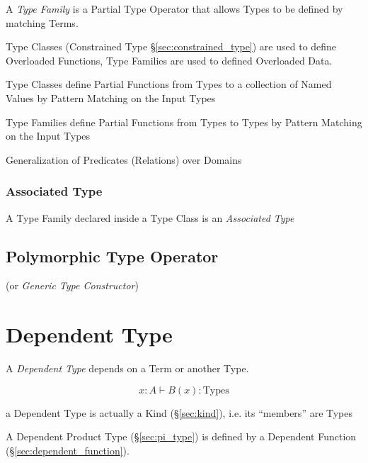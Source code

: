 A \emph{Type Family} is a Partial Type Operator that allows Types to
be defined by matching Terms.


Type Classes (Constrained Type \S\ref{sec:constrained_type}) are used
to define Overloaded Functions, Type Families are used to defined
Overloaded Data.

Type Classes define Partial Functions from Types to a collection of
Named Values by Pattern Matching on the Input Types

Type Families define Partial Functions from Types to Types by Pattern
Matching on the Input Types

Generalization of Predicates (Relations) over Domains



\subsubsection{Associated Type}\label{sec:associated_type}

A Type Family declared inside a Type Class is an \emph{Associated
  Type}



\subsection{Polymorphic Type Operator}
\label{sec:polymorphic_type_operator}

(or \emph{Generic Type Constructor})



\section{Dependent Type}\label{sec:dependent_type}

A \emph{Dependent Type} depends on a Term or another Type.

\[
  x : A \vdash B(x):\mathrm{Types}
\]

a Dependent Type is actually a Kind (\S\ref{sec:kind}), i.e. its
``members'' are Types

A Dependent Product Type (\S\ref{sec:pi_type}) is defined by
a Dependent Function (\S\ref{sec:dependent_function}).

